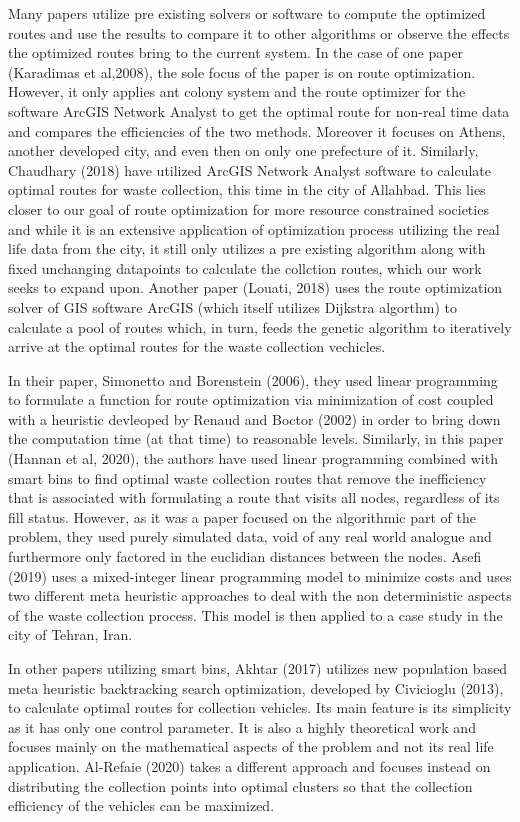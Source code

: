 \documentclass[12pt]{article}
\begin{document}
Many papers utilize pre existing solvers or software to compute the optimized routes and use the results to compare it to other algorithms or observe the effects the optimized routes bring to the current system. In the case of one paper (Karadimas et al,2008), the sole focus of the paper is on route optimization. However, it only applies ant colony system and the route optimizer for the software ArcGIS Network Analyst to get the optimal route for non-real time data and compares the efficiencies of the two methods. Moreover it focuses on Athens, another developed city, and even then on only one prefecture of it. Similarly, Chaudhary (2018) have utilized ArcGIS Network Analyst software to calculate optimal routes for waste collection, this time in the city of Allahbad. This lies closer to our goal of route optimization for more resource constrained societies and while it is an extensive application of optimization process utilizing the real life data from the city, it still only utilizes a pre existing algorithm along with fixed unchanging datapoints to calculate the collction routes, which our work seeks to expand upon. Another paper (Louati, 2018) uses the route optimization solver of GIS software ArcGIS (which itself utilizes Dijkstra algorthm) to calculate a pool of routes which, in turn, feeds the genetic algorithm to iteratively arrive at the optimal routes for the waste collection vechicles.

In their paper, Simonetto and Borenstein (2006), they used linear programming to formulate a function for route optimization via minimization of cost coupled with a heuristic devleoped by Renaud and Boctor (2002) in order to bring down the computation time (at that time) to reasonable levels. Similarly, in this paper (Hannan et al, 2020), the authors have used linear programming combined with smart bins to find optimal waste collection routes that remove the inefficiency that is associated with formulating a route that visits all nodes, regardless of its fill status. However, as it was a paper focused on the algorithmic part of the problem, they used purely simulated data, void of any real world analogue and furthermore only factored in the euclidian distances between the nodes. Asefi (2019) uses a mixed-integer linear programming model to minimize costs and uses two different meta heuristic approaches to deal with the non deterministic aspects of the waste collection process. This model is then applied to a case study in the city of Tehran, Iran. 

In other papers utilizing smart bins, Akhtar (2017) utilizes new population based meta heuristic backtracking search optimization, developed by Civicioglu (2013), to calculate optimal routes for collection vehicles. Its main feature is its simplicity as it has only one control parameter. It is also a highly theoretical work and focuses mainly on the mathematical aspects of the problem and not its real life application. Al-Refaie (2020) takes a different approach and focuses instead on distributing the collection points into optimal clusters so that the collection efficiency of the vehicles can be maximized.
\end{document}
